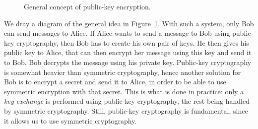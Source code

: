 \begin{figure}[h]
  \caption{General concept of public-key encryption.}
  \label{fig:crypto-asym}
\end{figure}
We dray a diagram of the general idea in Figure~\ref{fig:crypto-asym}. With such
a system, only Bob can send messages to Alice. If Alice wants to send a message
to Bob using public-key cryptography, then Bob has to create his own pair of
keys. He then gives his public key to Alice, that can then encrypt her message
using this key and send it to Bob. Bob decrypts the message using his private
key. Public-key cryptography is somewhat heavier than symmetric
cryptography, hence another solution for Bob is to encrypt a secret and send it
to Alice, in order to be able to use symmetric encryption with that secret. This
is what is done in practice: only a \emph{key exchange} is performed using
public-key cryptography, the rest being handled by symmetric cryptography.
Still, public-key cryptography is fundamental, since it allows us to use
symmetric cryptography.

